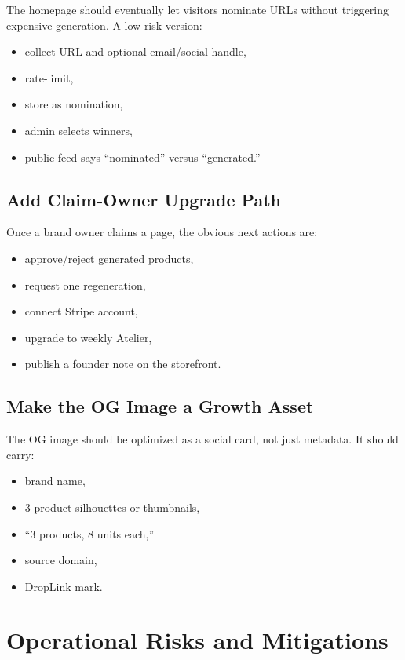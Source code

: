 \documentclass[11pt]{article}
\begin{document}
The homepage should eventually let visitors nominate URLs without triggering expensive generation. A low-risk version:

\begin{itemize}
  \item collect URL and optional email/social handle,
  \item rate-limit,
  \item store as nomination,
  \item admin selects winners,
  \item public feed says ``nominated'' versus ``generated.''
\end{itemize}

\subsection{Add Claim-Owner Upgrade Path}

Once a brand owner claims a page, the obvious next actions are:

\begin{itemize}
  \item approve/reject generated products,
  \item request one regeneration,
  \item connect Stripe account,
  \item upgrade to weekly Atelier,
  \item publish a founder note on the storefront.
\end{itemize}

\subsection{Make the OG Image a Growth Asset}

The OG image should be optimized as a social card, not just metadata. It should carry:

\begin{itemize}
  \item brand name,
  \item 3 product silhouettes or thumbnails,
  \item ``3 products, 8 units each,''
  \item source domain,
  \item DropLink mark.
\end{itemize}

\section{Operational Risks and Mitigations}
\end{document}
